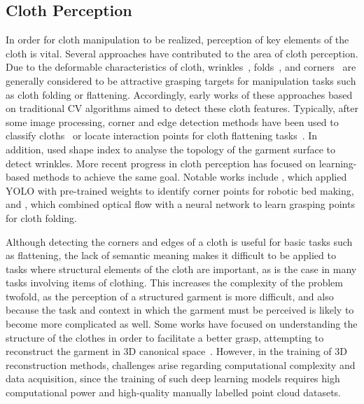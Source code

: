 \documentclass[letterpaper, 10 pt, conference]{ieeeconf}  %
\begin{document}
\subsection{Cloth Perception}
In order for cloth manipulation to be realized, perception of key elements of the cloth is vital. Several approaches have contributed to the area of cloth perception. Due to the deformable characteristics of cloth, wrinkles~\cite{sun2017single, yuan2018active}, folds~\cite{moriya2018method}, and corners~\cite{seita_bedmake_2019, jangir2020dynamic, weng2022fabricflownet,matas2018sim} are generally considered to be attractive grasping targets for manipulation tasks such as cloth folding or flattening.
Accordingly, early works of these approaches based on traditional CV algorithms aimed to detect these cloth features. Typically, after some image processing, corner and edge detection methods have been used to classify cloths~\cite{willimon2011classification} or locate interaction points for cloth flattening tasks~\cite{maitin2010cloth, triantafyllou2011vision}. In addition, \cite{sun2015accurate} used shape index to analyse the topology of the garment surface to detect wrinkles. More recent progress in cloth perception has focused on learning-based methods to achieve the same goal. Notable works include \cite{seita_bedmake_2019}, which applied YOLO with pre-trained weights to identify corner points for robotic bed making, and \cite{weng2022fabricflownet}, which combined optical flow with a neural network to learn grasping points for cloth folding.

Although detecting the corners and edges of a cloth is useful for basic tasks such as flattening, the lack of semantic meaning makes it difficult to be applied to tasks where structural elements of the cloth are important, as is the case in many tasks involving items of clothing. This increases the complexity of the problem twofold, as the perception of a structured garment is more difficult, and also because the task and context in which the garment must be perceived is likely to become more complicated as well. Some works have focused on understanding the structure of the clothes in order to facilitate a better grasp, attempting to reconstruct the garment in 3D canonical space~\cite{chi2021garmentnets}. However, in the training of 3D reconstruction methods, challenges arise regarding computational complexity and data acquisition, since the training of such deep learning models requires high computational power and high-quality manually labelled point cloud datasets.
\end{document}
